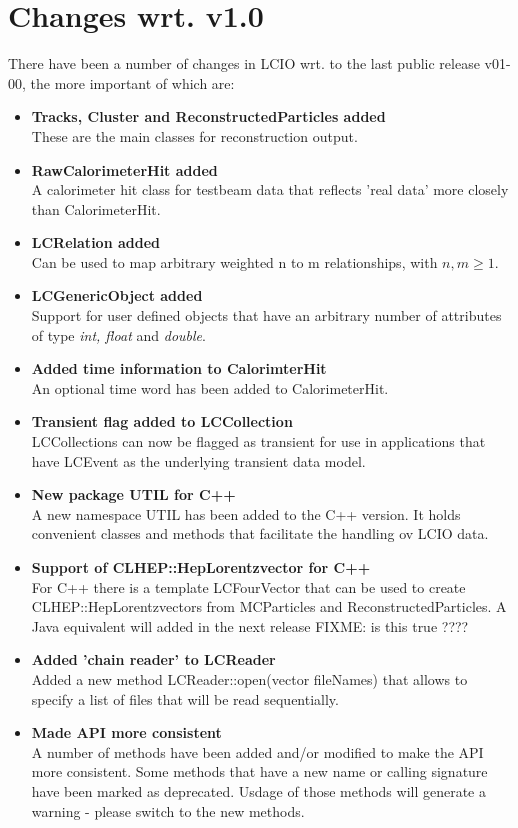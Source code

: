 \documentclass[twoside]{article}
\begin{document}
\newpage 
\begin{latexonly}
\end{latexonly}

\section{Changes wrt. v1.0}
There have been a number of changes in LCIO wrt. to the last public release v01-00, the more important 
of which are:
\begin{itemize}
\item{{\bf Tracks, Cluster and ReconstructedParticles added} \\
These are the main classes for reconstruction output.
}
\item{{\bf RawCalorimeterHit added} \\
A calorimeter hit class for testbeam data that reflects 'real data' more closely than CalorimeterHit. 
}
\item{{\bf LCRelation added} \\
Can be used to map arbitrary weighted n to m relationships, with $n,m \ge 1$.
}
\item{{\bf LCGenericObject added} \\
Support for user defined objects that have an arbitrary number of attributes of type {\em int, float}
and {\it double}.
}
\item{{\bf Added time information to CalorimterHit} \\
An optional time word has been added to CalorimeterHit.
}
\item{{\bf Transient flag added to LCCollection} \\
LCCollections can now be flagged as transient for use in applications that have LCEvent as the
underlying transient data model.
}
\item{{\bf  New package UTIL for C++} \\
A new namespace UTIL has been added to the C++ version. It holds convenient classes and methods
that facilitate the handling ov LCIO data.
}
\item{{\bf Support of CLHEP::HepLorentzvector for C++}\\
For C++ there is a template LCFourVector that can be used to create CLHEP::HepLorentzvectors
from MCParticles and ReconstructedParticles.
A Java equivalent will added in the next release FIXME: is this true ???? }
\item{{\bf Added 'chain reader' to LCReader} \\
Added a new method LCReader::open(vector fileNames) that allows to specify a list of files that
will be read sequentially. \\
}
\item{{\bf Made API more consistent} \\
A number of methods have been added and/or modified to make the API more consistent. Some methods
that have a new name or calling signature have been marked as deprecated. Usdage of those methods will
generate a warning - please switch to the new methods. 
}

\end{itemize}
\end{document}
